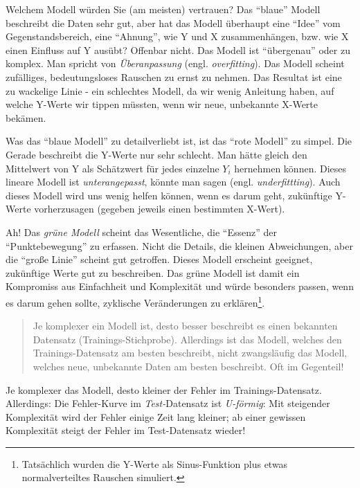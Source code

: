 \documentclass[12pt,]{book}
\begin{document}
Welchem Modell würden Sie (am meisten) vertrauen? Das ``blaue'' Modell
beschreibt die Daten sehr gut, aber hat das Modell überhaupt eine
``Idee'' vom Gegenstandsbereich, eine ``Ahnung'', wie Y und X
zusammenhängen, bzw. wie X einen Einfluss auf Y ausübt? Offenbar nicht.
Das Modell ist ``übergenau'' oder zu komplex. Man spricht von
\emph{Überanpassung} (engl.
\emph{overfitting}). Das Modell scheint zufälliges,
bedeutungsloses Rauschen zu ernst zu nehmen. Das Resultat ist eine zu
wackelige Linie - ein schlechtes Modell, da wir wenig Anleitung haben,
auf welche Y-Werte wir tippen müssten, wenn wir neue, unbekannte X-Werte
bekämen.

Was das ``blaue Modell'' zu detailverliebt ist, ist das ``rote Modell''
zu simpel. Die Gerade beschreibt die Y-Werte nur sehr schlecht. Man
hätte gleich den Mittelwert von Y als Schätzwert für jedes einzelne
\(Y_i\) hernehmen können. Dieses lineare Modell ist
\emph{unterangepasst}, könnte man sagen (engl.
\emph{underfittting}). Auch dieses Modell wird uns
wenig helfen können, wenn es darum geht, zukünftige Y-Werte
vorherzusagen (gegeben jeweils einen bestimmten X-Wert).

Ah! Das \emph{grüne Modell} scheint das Wesentliche, die ``Essenz'' der
``Punktebewegung'' zu erfassen. Nicht die Details, die kleinen
Abweichungen, aber die ``große Linie'' scheint gut getroffen. Dieses
Modell erscheint geeignet, zukünftige Werte gut zu beschreiben. Das
grüne Modell ist damit ein Kompromiss aus Einfachheit und Komplexität
und würde besonders passen, wenn es darum gehen sollte, zyklische
Veränderungen zu erklären\footnote{Tatsächlich wurden die Y-Werte als
  Sinus-Funktion plus etwas normalverteiltes Rauschen simuliert.}.

\begin{quote}
Je komplexer ein Modell ist, desto besser beschreibt es einen bekannten
Datensatz (Trainings-Stichprobe). Allerdings ist das Modell, welches den
Trainings-Datensatz am besten beschreibt, nicht zwangsläufig das Modell,
welches neue, unbekannte Daten am besten beschreibt. Oft im Gegenteil!
\end{quote}

Je komplexer das Modell, desto kleiner der Fehler im
Trainings-Datensatz. Allerdings: Die Fehler-Kurve im
\emph{Test-}Datensatz ist \emph{U-förmig}: Mit steigender Komplexität
wird der Fehler einige Zeit lang kleiner; ab einer gewissen Komplexität
steigt der Fehler im Test-Datensatz wieder!
\end{document}
